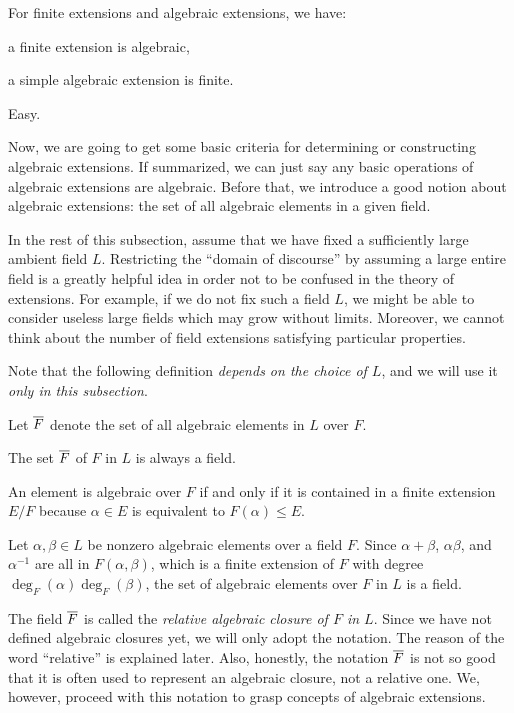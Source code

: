 \documentclass{../exp}
\begin{document}
\begin{prop}
For finite extensions and algebraic extensions, we have:
\begin{cond}
\item a finite extension is algebraic,
\item a simple algebraic extension is finite.
\end{cond}
\end{prop}
\begin{pf} Easy. \end{pf}

Now, we are going to get some basic criteria for determining or constructing algebraic extensions.
If summarized, we can just say any basic operations of algebraic extensions are algebraic.
Before that, we introduce a good notion about algebraic extensions: the set of all algebraic elements in a given field.

In the rest of this subsection, assume that we have fixed a sufficiently large ambient field $L$.
Restricting the ``domain of discourse'' by assuming a large entire field is a greatly helpful idea in order not to be confused in the theory of extensions.
For example, if we do not fix such a field $L$, we might be able to consider useless large fields which may grow without limits.
Moreover, we cannot think about the number of field extensions satisfying particular properties.

Note that the following definition \emph{depends on the choice of $L$}, and we will use it \emph{only in this subsection}.
\begin{defn}
Let $\overline F$ denote the set of all algebraic elements in $L$ over $F$.
\end{defn}
\begin{prop}
The set $\overline F$ of $F$ in $L$ is always a field.
\end{prop}
\begin{pf}
An element is algebraic over $F$ if and only if it is contained in a finite extension $E/F$ because $\alpha\in E$ is equivalent to $F(\alpha)\le E$.

Let $\alpha,\beta\in L$ be nonzero algebraic elements over a field $F$.
Since $\alpha+\beta$, $\alpha\beta$, and $\alpha^{-1}$ are all in $F(\alpha,\beta)$, which is a finite extension of $F$ with degree $\deg_F(\alpha)\deg_F(\beta)$, the set of algebraic elements over $F$ in $L$ is a field.
\end{pf}
\begin{rmk}
The field $\overline F$ is called the \emph{relative algebraic closure of $F$ in $L$}.
Since we have not defined algebraic closures yet, we will only adopt the notation.
The reason of the word ``relative'' is explained later.
Also, honestly, the notation $\overline F$ is not so good that it is often used to represent an algebraic closure, not a relative one.
We, however, proceed with this notation to grasp concepts of algebraic extensions.
\end{rmk}
\end{document}
